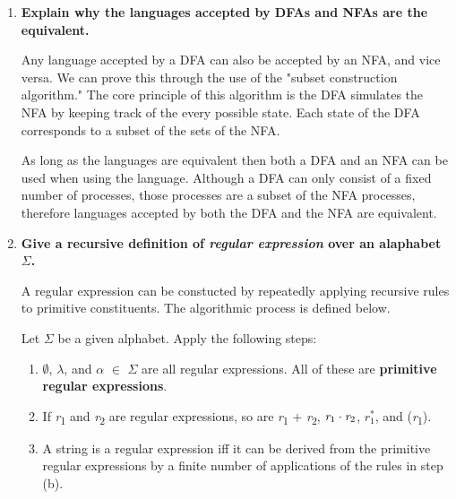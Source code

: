 \documentclass{article}
\begin{document}
\begin{enumerate}
    \medskip

    \item \textbf{Explain why the languages accepted by DFAs and NFAs are the equivalent.}
    
    \medskip

    \-\hspace{0.5cm} Any language accepted by a DFA can also be accepted by an NFA,
     and vice versa. We can prove this through the use of the "subset construction
     algorithm." The core principle of this algorithm is the DFA simulates the NFA
     by keeping track of the every possible state. Each state of the DFA corresponds
     to a subset of the sets of the NFA.

     \-\hspace{0.5cm} As long as the languages are equivalent then both a DFA and an 
     NFA can be used when using the language. Although a DFA can only consist of a 
     fixed number of processes, those processes are a subset of the NFA processes,
     therefore languages accepted by both the DFA and the NFA are equivalent.

    \medskip

    \item \textbf{Give a recursive definition of \textit{regular expression} over
            an alaphabet $\Sigma$.}

    \medskip

    \-\hspace{0.5cm} A regular expression can be constucted by repeatedly applying
    recursive rules to primitive constituents. The algorithmic process is defined 
    below.

    \-\hspace{0.5cm} Let $\Sigma$ be a given alphabet. Apply the following steps:

    \begin{enumerate}
        \item $\emptyset$, $\lambda$, and $\alpha$ $\in$ $\Sigma$ are all regular
        expressions. All of these are \textbf{primitive regular expressions}.
        \item If \textit{r}\textsubscript{1} and \textit{r}\textsubscript{2} are
        regular expressions, so are \textit{r}\textsubscript{1} + 
        \textit{r}\textsubscript{2}, $\textit{r}\textsubscript{1} \cdot
        \textit{r}\textsubscript{2}$, $r_1^*$, and (\textit{r}\textsubscript{1}).
        \item A string is a regular expression iff it can be derived from the 
        primitive regular expressions by a finite number of applications of the
        rules in step (b).
    \end{enumerate}



\end{enumerate}
\end{document}
